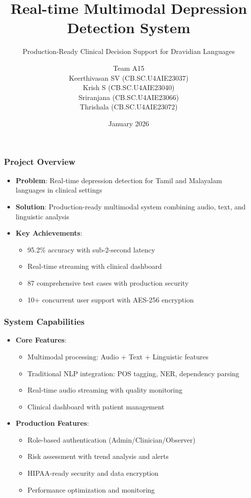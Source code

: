 \documentclass{beamer}
\title[Multimodal Depression Detection]{Real-time Multimodal Depression Detection System}
\subtitle{Production-Ready Clinical Decision Support for Dravidian Languages}
\author{
Team A15\\[0.4em]
Keerthivasan SV (CB.SC.U4AIE23037)\\
Krish S (CB.SC.U4AIE23040)\\
Sriranjana (CB.SC.U4AIE23066)\\
Thrishala (CB.SC.U4AIE23072)
}
\date{January 2026}
\begin{document}
\begin{frame}
\titlepage
\end{frame}

\begin{frame}
\frametitle{Project Overview}
\begin{itemize}
    \item \textbf{Problem}: Real-time depression detection for Tamil and Malayalam languages in clinical settings
    \item \textbf{Solution}: Production-ready multimodal system combining audio, text, and linguistic analysis
    \item \textbf{Key Achievements}:
    \begin{itemize}
        \item 95.2\% accuracy with sub-2-second latency
        \item Real-time streaming with clinical dashboard
        \item 87 comprehensive test cases with production security
        \item 10+ concurrent user support with AES-256 encryption
    \end{itemize}
\end{itemize}
\end{frame}

\begin{frame}
\frametitle{System Capabilities}
\begin{itemize}
    \item \textbf{Core Features}:
    \begin{itemize}
        \item Multimodal processing: Audio + Text + Linguistic features
        \item Traditional NLP integration: POS tagging, NER, dependency parsing
        \item Real-time audio streaming with quality monitoring
        \item Clinical dashboard with patient management
    \end{itemize}
    \item \textbf{Production Features}:
    \begin{itemize}
        \item Role-based authentication (Admin/Clinician/Observer)
        \item Risk assessment with trend analysis and alerts
        \item HIPAA-ready security and data encryption
        \item Performance optimization and monitoring
    \end{itemize}
\end{itemize}
\end{frame}
\end{document}
